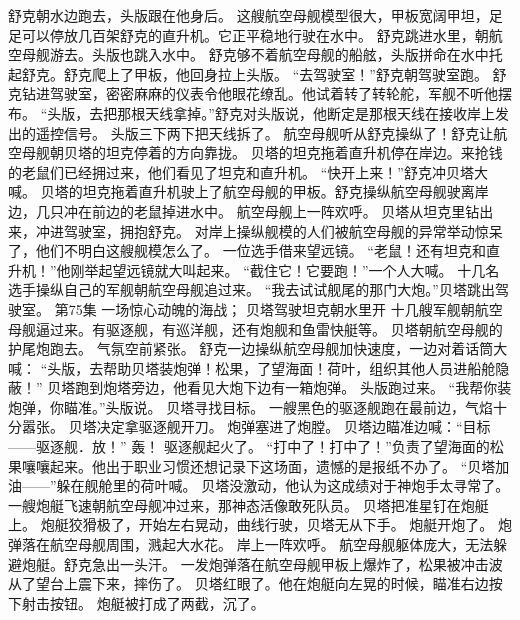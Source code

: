 \documentclass[a4paper,12pt,UTF8,twoside]{ctexbook}
\begin{document}
        舒克朝水边跑去，头版跟在他身后。 
        这艘航空母舰模型很大，甲板宽阔甲坦，足足可以停放几百架舒克的直升机。它正平稳地行驶在水中。 
        舒克跳进水里，朝航空母舰游去。头版也跳入水中。 
        舒克够不着航空母舰的船舷，头版拼命在水中托起舒克。舒克爬上了甲板，他回身拉上头版。 
        “去驾驶室！”舒克朝驾驶室跑。 
        舒克钻进驾驶室，密密麻麻的仪表令他眼花缭乱。他试着转了转轮舵，军舰不听他摆布。 
        “头版，去把那根天线拿掉。”舒克对头版说，他断定是那根天线在接收岸上发出的遥控信号。 
        头版三下两下把天线拆了。 
        航空母舰听从舒克操纵了！舒克让航空母舰朝贝塔的坦克停着的方向靠拢。 
        贝塔的坦克拖着直升机停在岸边。来抢钱的老鼠们已经拥过来，他们看见了坦克和直升机。 
        “快开上来！”舒克冲贝塔大喊。 
        贝塔的坦克拖着直升机驶上了航空母舰的甲板。舒克操纵航空母舰驶离岸边，几只冲在前边的老鼠掉进水中。 
        航空母舰上一阵欢呼。 
        贝塔从坦克里钻出来，冲进驾驶室，拥抱舒克。 
        对岸上操纵舰模的人们被航空母舰的异常举动惊呆了，他们不明白这艘舰模怎么了。 
        一位选手借来望远镜。 
        “老鼠！还有坦克和直升机！”他刚举起望远镜就大叫起来。 
        “截住它！它要跑！”一个人大喊。 
        十几名选手操纵自己的军舰朝航空母舰追过来。 
        “我去试试舰尾的那门大炮。”贝塔跳出驾驶室。   第75集 
        一场惊心动魄的海战； 
        贝塔驾驶坦克朝水里开   
        十几艘军舰朝航空母舰逼过来。有驱逐舰，有巡洋舰，还有炮舰和鱼雷快艇等。 
        贝塔朝航空母舰的护尾炮跑去。 
        气氛空前紧张。 
        舒克一边操纵航空母舰加快速度，一边对着话筒大喊： 
        “头版，去帮助贝塔装炮弹！松果，了望海面！荷叶，组织其他人员进船舱隐蔽！” 
        贝塔跑到炮塔旁边，他看见大炮下边有一箱炮弹。 
        头版跑过来。 
        “我帮你装炮弹，你瞄准。”头版说。 
        贝塔寻找目标。 
        一艘黑色的驱逐舰跑在最前边，气焰十分嚣张。 
        贝塔决定拿驱逐舰开刀。 
        炮弹塞进了炮膛。 
        贝塔边瞄准边喊：“目标——驱逐舰．放！” 
        轰！ 
        驱逐舰起火了。 
        “打中了！打中了！”负责了望海面的松果嚷嚷起来。他出于职业习惯还想记录下这场面，遗憾的是报纸不办了。 
        “贝塔加油——”躲在舰舱里的荷叶喊。 
        贝塔没激动，他认为这成绩对于神炮手太寻常了。 
        一艘炮艇飞速朝航空母舰冲过来，那神态活像敢死队员。 
        贝塔把准星钉在炮艇上。 
        炮艇狡猾极了，开始左右晃动，曲线行驶，贝塔无从下手。 
        炮艇开炮了。 
        炮弹落在航空母舰周围，溅起大水花。 
        岸上一阵欢呼。 
        航空母舰躯体庞大，无法躲避炮艇。舒克急出一头汗。 
        一发炮弹落在航空母舰甲板上爆炸了，松果被冲击波从了望台上震下来，摔伤了。 
        贝塔红眼了。他在炮艇向左晃的时候，瞄准右边按下射击按钮。 
        炮艇被打成了两截，沉了。 
\end{document}

